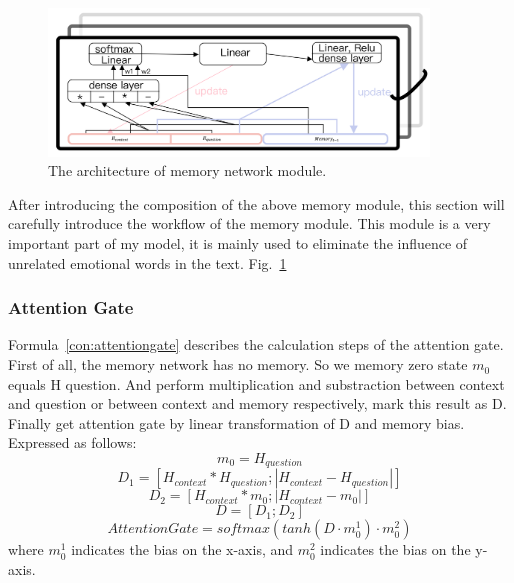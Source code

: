\documentclass[runningheads, twocolumn]{llncs}
\begin{document}
\begin{figure}[htb]
	\includegraphics[width=0.9\textwidth]{memoryNetwork.png}
	\centering
	\caption{The architecture of memory network module.}\label{memorynetwork}
\end{figure}

After introducing the composition of the above memory module, this section will carefully introduce the workflow of the memory module. This module is a very important part of my model, it is mainly used to eliminate the influence of unrelated emotional words in the text.
Fig.~\ref{memorynetwork}


\subsubsection{Attention Gate}
Formula~\ref{con:attentiongate} describes the calculation steps of the attention gate. First of all, the memory network has no memory. So we memory zero state $m_0$ equals H question. And perform multiplication and substraction between context and question  or between context and memory respectively, mark this result as D. Finally get attention gate by linear transformation of D and memory bias. Expressed as follows:
\begin{equation}
m_0 = H_{question}
\end{equation}
\begin{equation}
D_1 = [H_{context}*H_{question}; |H_{context}-H_{question}|]
\end{equation}
\begin{equation}
D_2 = [H_{context}*m_0; |H_{context}-m_0|]
\end{equation}
\begin{equation}
D = [D_1; D_2]
\end{equation}
\begin{equation}
AttentionGate = softmax(tanh(D\cdot m_0^1)\cdot m_0^2)
\end{equation}
where $m_0^1$ indicates the bias on the x-axis, and $m_0^2$ indicates the bias on the y-axis.
\end{document}
